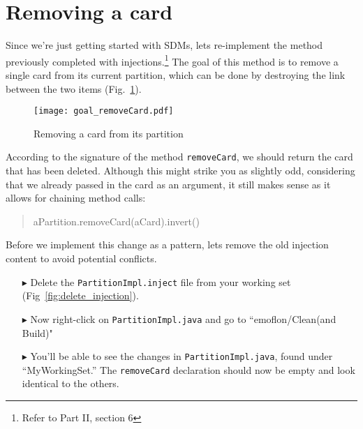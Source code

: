 \newpage
\genHeader
\section{Removing a card}
\hypertarget{sec:remCard}{}

Since we're just getting started with SDMs, lets re-implement the method previously completed with injections.\footnote{Refer to Part II, section 6} The goal of
this method is to remove a single card from its current partition, which can be done by destroying the link between the two items (Fig.~\ref{fig:goal_removeCard}).

\vspace{0.5cm}

\begin{figure}[htbp]
	\centering
    \texttt{[image: goal\_removeCard.pdf]}
	\caption{Removing a card from its partition}
	\label{fig:goal_removeCard}
\end{figure}
\FloatBarrier

\vspace{0.5cm}

According to the signature of the method \texttt{removeCard}, we should return the card that has been deleted. Although this might strike you as slightly odd,
considering that we already passed in the card as an argument, it still makes sense as it allows for chaining method calls:
{ \begin{quote} \small aPartition.removeCard(aCard).invert() \end{quote} }

Before we implement this change as a pattern, lets remove the old injection content to avoid potential conflicts.

\begin{itemize}

\item[$\blacktriangleright$] Delete the \texttt{PartitionImpl.inject} file from your working set (Fig~\ref{fig:delete_injection}).

\item[$\blacktriangleright$] Now right-click on \texttt{PartitionImpl.java} and go to ``emoflon/Clean(and Build)" 

\item[$\blacktriangleright$] You'll be able to see the changes in \texttt{PartitionImpl.java}, found under ``MyWorkingSet.'' The \texttt{removeCard}
declaration should now be empty and look identical to the others.

\end{itemize}

